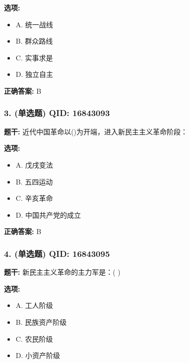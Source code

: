\documentclass[12pt,UTF8]{ctexart}
\begin{document}
\textbf{选项:}
\begin{itemize}[leftmargin=*]

  \item A. 统一战线

  \item B. 群众路线

  \item C. 实事求是

  \item D. 独立自主

\end{itemize}

\textbf{正确答案:}
B

\vspace{0.3em}\hrulefill\vspace{0.7em}

\subsubsection*{3. (单选题) \small QID: 16843093}

\textbf{题干:}
近代中国革命以()为开端，进入新民主主义革命阶段：

\textbf{选项:}
\begin{itemize}[leftmargin=*]

  \item A. 戊戌变法

  \item B. 五四运动

  \item C. 辛亥革命

  \item D. 中国共产党的成立

\end{itemize}

\textbf{正确答案:}
B

\vspace{0.3em}\hrulefill\vspace{0.7em}

\subsubsection*{4. (单选题) \small QID: 16843095}

\textbf{题干:}
新民主主义革命的主力军是：( )

\textbf{选项:}
\begin{itemize}[leftmargin=*]

  \item A. 工人阶级

  \item B. 民族资产阶级

  \item C. 农民阶级

  \item D. 小资产阶级

\end{itemize}
\end{document}
